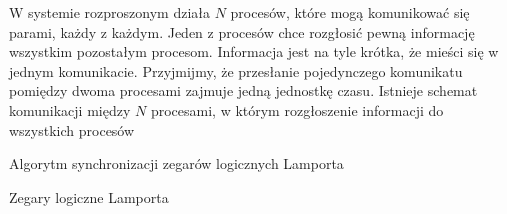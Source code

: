 \begin{problems}
    \prob W systemie rozproszonym działa $N$ procesów, które mogą komunikować się parami, każdy z każdym. Jeden z procesów chce rozgłosić pewną informację wszystkim pozostałym procesom. Informacja jest na tyle krótka, że mieści się w jednym komunikacie. Przyjmijmy, że przesłanie pojedynczego komunikatu pomiędzy dwoma procesami zajmuje jedną jednostkę czasu. Istnieje schemat komunikacji między $N$ procesami, w którym rozgłoszenie informacji do wszystkich procesów

    \prob Algorytm synchronizacji zegarów logicznych Lamporta

    \prob Zegary logiczne Lamporta
\end{problems}


